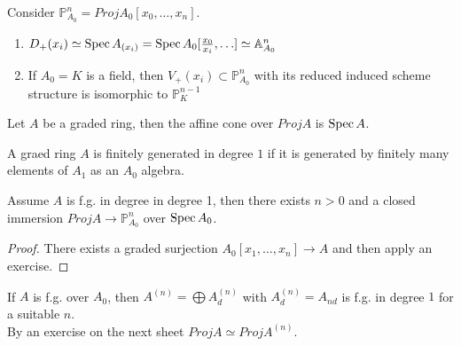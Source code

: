 \documentclass[../main.tex]{subfiles}
\begin{document}
\begin{rmq}
	Consider $\mathbb{P}^{n}_{A_0} = Proj A_0[x_0,\ldots,x_n]$.
	\begin{enumerate}
	\item $D_+( x_i) \simeq \operatorname{Spec} A_{( x_i) } = \operatorname{Spec} A_0 [ \frac{x_0}{x_i},\ldots] \simeq \mathbb{A}^{n}_{A_0} $ 
	\item If $A_0=K$ is a field, then $V_+( x_i) \subset \mathbb{P}^{n}_{A_0} $ with its reduced induced scheme structure is isomorphic to $ \mathbb{P}^{n-1}_{K} $ 
	\end{enumerate}
	
\end{rmq}
\begin{defn}
Let $A$ be a graded ring, then the affine cone over $Proj A$ is $\operatorname{Spec} A$.
\end{defn}
\begin{defn}
	A graed ring $A$ is finitely generated in degree $1$ if it is generated by finitely many elements of $A_1$  as an $A_0$ algebra.
\end{defn}
\begin{lemma}
Assume $A$ is f.g. in degree in degree 1, then there exists $n>0$ and a closed immersion $Proj A \to \mathbb{P}^{n}_{A_0} $ over $\operatorname{Spec} A_0$.
\end{lemma}
\begin{proof}
	There exists a graded surjection $A_0[x_1,\ldots,x_n]\to A$ and then apply an exercise.
\end{proof}
\begin{rmq}
If $A$ is f.g. over $A_0$, then $A^{( n) }= \bigoplus A^{( n) }_d$ with $A^{( n) }_d = A_{nd} $ is f.g. in degree $1$ for a suitable $n$.\\
By an exercise on the next sheet $Proj A\simeq Proj A^{( n) }$.
\end{rmq}
\end{document}
